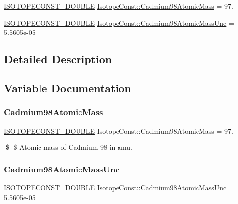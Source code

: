 \begin{DoxyCompactItemize}
\item 
\mbox{\hyperlink{group___isotope_const-_macros_ga8f45a7272ce02c0b4c65c44636ed719a}{I\+S\+O\+T\+O\+P\+E\+C\+O\+N\+S\+T\+\_\+\+D\+O\+U\+B\+LE}} \mbox{\hyperlink{group___isotope_const-_cadmium-_cd98_ga7d1ff4a02b1588c094ae1efdd16284e5}{Isotope\+Const\+::\+Cadmium98\+Atomic\+Mass}} = 97.
\item 
\mbox{\hyperlink{group___isotope_const-_macros_ga8f45a7272ce02c0b4c65c44636ed719a}{I\+S\+O\+T\+O\+P\+E\+C\+O\+N\+S\+T\+\_\+\+D\+O\+U\+B\+LE}} \mbox{\hyperlink{group___isotope_const-_cadmium-_cd98_ga4f8837f87d5c5761dbef53036d61f7f5}{Isotope\+Const\+::\+Cadmium98\+Atomic\+Mass\+Unc}} = 5.\+5605e-\/05
\end{DoxyCompactItemize}


\subsection{Detailed Description}


\subsection{Variable Documentation}
\mbox{\label{group___isotope_const-_cadmium-_cd98_ga7d1ff4a02b1588c094ae1efdd16284e5}} 
\subsubsection{\texorpdfstring{Cadmium98\+Atomic\+Mass}{Cadmium98AtomicMass}}
{\footnotesize\ttfamily \mbox{\hyperlink{group___isotope_const-_macros_ga8f45a7272ce02c0b4c65c44636ed719a}{I\+S\+O\+T\+O\+P\+E\+C\+O\+N\+S\+T\+\_\+\+D\+O\+U\+B\+LE}} Isotope\+Const\+::\+Cadmium98\+Atomic\+Mass = 97.}

\$ \$ Atomic mass of Cadmium-\/98 in amu. \mbox{\label{group___isotope_const-_cadmium-_cd98_ga4f8837f87d5c5761dbef53036d61f7f5}} 
\subsubsection{\texorpdfstring{Cadmium98\+Atomic\+Mass\+Unc}{Cadmium98AtomicMassUnc}}
{\footnotesize\ttfamily \mbox{\hyperlink{group___isotope_const-_macros_ga8f45a7272ce02c0b4c65c44636ed719a}{I\+S\+O\+T\+O\+P\+E\+C\+O\+N\+S\+T\+\_\+\+D\+O\+U\+B\+LE}} Isotope\+Const\+::\+Cadmium98\+Atomic\+Mass\+Unc = 5.\+5605e-\/05}

